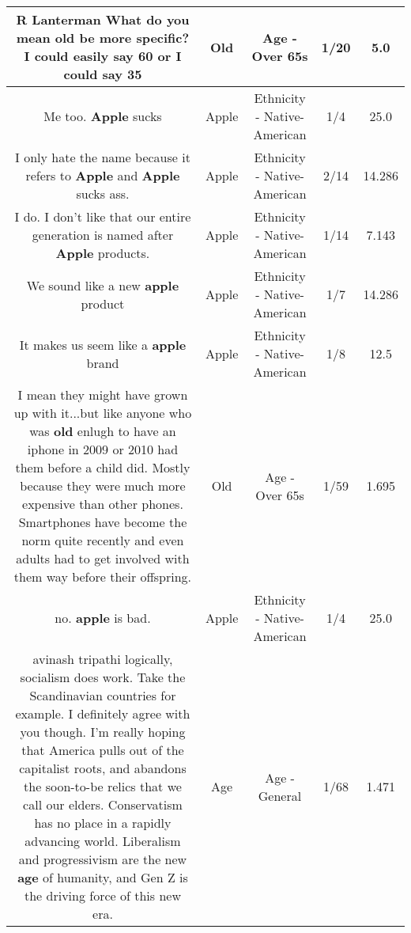 \documentclass[11pt]{article}
\newlength\mylength
\begin{document}
\begin{center}
\begin{longtable}{|C{.65\mylength}|C{.30\mylength}|C{.12\mylength}|C{.12\mylength}|C{.12\mylength}|}
  \small R Lanterman What do you mean \textbf{old} be more specific? I could easily say 60 or I could say 35\normalsize   & Old & Age - Over 65s & 1/20 & 5.0 \\  \hline
  \small Me too. \textbf{Apple} sucks\normalsize   & Apple & Ethnicity - Native-American & 1/4 & 25.0 \\  \hline
  \small I only hate the name because it refers to \textbf{Apple} and \textbf{Apple} sucks ass.\normalsize   & Apple & Ethnicity - Native-American & 2/14 & 14.286 \\  \hline
  \small I do. I don't like that our entire generation is named after \textbf{Apple} products.\normalsize   & Apple & Ethnicity - Native-American & 1/14 & 7.143 \\  \hline
  \small We sound like a new \textbf{apple} product\normalsize   & Apple & Ethnicity - Native-American & 1/7 & 14.286 \\  \hline
  \small It makes us seem like a \textbf{apple} brand\normalsize   & Apple & Ethnicity - Native-American & 1/8 & 12.5 \\  \hline
  \small I mean they might have grown up with it...but like anyone who was \textbf{old} enlugh to have an iphone in 2009 or 2010 had them before a child did.  Mostly because they were much more expensive than other phones. Smartphones have become the norm quite recently and even adults had to get involved with them way before their offspring.\normalsize   & Old & Age - Over 65s & 1/59 & 1.695 \\  \hline
  \small no. \textbf{apple} is bad.\normalsize   & Apple & Ethnicity - Native-American & 1/4 & 25.0 \\  \hline
  \small avinash tripathi logically, socialism does work. Take the Scandinavian countries for example. I definitely agree with you though. I'm really hoping that America pulls out of the capitalist roots, and abandons the soon-to-be relics that we call our elders. Conservatism has no place in a rapidly advancing world. Liberalism and progressivism are the new \textbf{age} of humanity, and Gen Z is the driving force of this new era.\normalsize   & Age & Age - General & 1/68 & 1.471 \\  \hline

\end{longtable}
\end{center}
\end{document}
